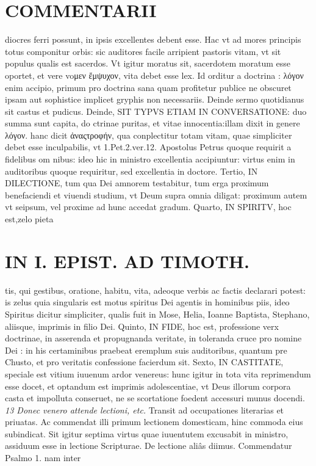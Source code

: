 \documentclass{article}
\begin{document}
\begin{pages}
\section*{COMMENTARII }
\marginpar{[ p.108 ]}\pstart diocres ferri possunt, in ipsis excellentes debent esse. Hac vt ad mores principis totus componitur orbis: sic auditores facile arripient pastoris vitam, vt sit populus qualis est sacerdos. Vt igitur moratus sit, sacerdotem moratum esse oportet, et vere voμεν ἔμψυχον, vita debet esse lex. Id orditur a doctrina : λόγον enim accipio, primum pro doctrina sana quam profitetur publice ne obscuret ipsam aut sophistice implicet gryphis non necessariis. Deinde sermo quotidianus sit castus et pudicus.  \pend\pstart Deinde, SIT TYPVS ETIAM IN CONVERSATIONE: duo summa sunt capita, do ctrinae puritas, et vitae innocentia:illam dixit in genere λόγον. hanc dicit ἀναςτροφήν, qua conplectitur totam vitam, quae simpliciter debet esse inculpabilis, vt 1.Pet.2.ver.12. Apostolus Petrus quoque requirit a fidelibus om nibus: ideo hic in ministro excellentia accipiuntur: virtus enim in auditoribus quoque requiritur, sed excellentia in doctore.  \pend\pstart Tertio, IN DILECTIONE, tum qua Dei amnorem testabitur, tum erga proximum benefaciendi et viuendi studium, vt Deum supra omnia diligat: proximum autem vt seipsum, vel proxime ad hunc accedat gradum.  \pend\pstart Quarto, IN SPIRITV, hoc est,zelo pieta\pend
\section*{IN I. EPIST. AD TIMOTH. }
\marginpar{[ p.109 ]}\pstart tis, qui gestibus, oratione, habitu, vita, adeoque verbis ac factis declarari potest: is zelus quia singularis est motus spiritus Dei agentis in hominibus piis, ideo Spiritus dicitur simpliciter, qualis fuit in Mose, Helia, Ioanne Baptista, Stephano, aliisque, imprimis in filio Dei.  \pend\pstart Quinto, IN FIDE, hoc est, professione verx doctrinae, in asserenda et propugnanda veritate, in toleranda cruce pro nomine Dei : in his certaminibus praebeat eremplum suis auditoribus, quantum pre Chusto, et pro veritatis confessione facierdum sit.  \pend\pstart Sexto, IN CASTITATE, speciale est vitium iuuenum ardor venereus: hunc igitur in tota vita reprimendum esse docet, et optandum est imprimis adolescentiae, vt Deus illorum corpora casta et impolluta conseruet, ne se scortatione foedent accessuri munus docendi.  \pend
\textit{13 Donec venero attende lectioni, etc. }\pstart Transit ad occupationes literarias et priuatas. Ac commendat illi primum lectionem domesticam, hinc commoda eius subindicat. Sit igitur septima virtus quae iuuentutem excusabit in ministro, assiduum esse in lectione Scripturae. De lectione aliâs diimus. Commendatur Psalmo 1. nam inter  \pend

\end{pages}
\end{document}
